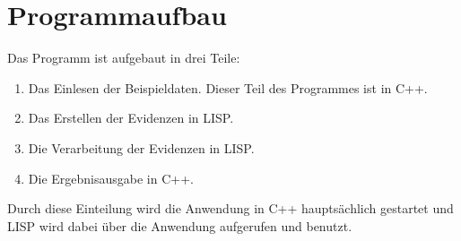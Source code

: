 \chapter{Programmaufbau}
Das Programm ist aufgebaut in drei Teile:

\begin{enumerate}
  \item Das Einlesen der Beispieldaten. Dieser Teil des Programmes ist in C++.
  \item Das Erstellen der Evidenzen in LISP.
  \item Die Verarbeitung der Evidenzen in LISP.
  \item Die Ergebnisausgabe in C++. 
\end{enumerate}

Durch diese Einteilung wird die Anwendung in C++ hauptsächlich gestartet und LISP wird dabei über die Anwendung aufgerufen und benutzt. 